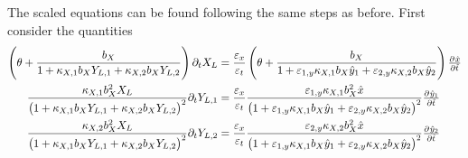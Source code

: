 \documentclass[11pt]{article}
\begin{document}
The scaled equations can be found following the same steps as before. First consider the quantities
\begin{subequations}
\label{eq:generalised-x_t-parts}
\begin{align}
    \left( \theta + \frac{b_X}{1 + \kappa_{X,1} b_{X} Y_{L,1} + \kappa_{X,2} b_{X} Y_{L,2}} \right) \partial_t X_L &= \frac{\varepsilon_x}{\varepsilon_t} \left( \theta + \frac{b_X}{1 + \varepsilon_{1,y} \kappa_{X,1} b_{X} \hat{y}_1 + \varepsilon_{2,y} \kappa_{X,2} b_{X} \hat{y}_2 } \right)  \pd{\hat{x}}{\hat{t}}
    \\
    \frac{\kappa_{X,1} b_X^2 X_L}{\big(1 + \kappa_{X,1} b_{X} Y_{L,1} + \kappa_{X,2} b_{X} Y_{L,2} \big)^2} \partial_t Y_{L,1} 
    &=
    \frac{\varepsilon_x}{\varepsilon_t} \frac{\varepsilon_{1,y} \kappa_{X,1} b_X^2 \hat{x}}{\big(1+ \varepsilon_{1,y} \kappa_{X,1} b_X \hat{y}_1 + \varepsilon_{2,y} \kappa_{X,2} b_X \hat{y}_2 \big)^2} \pd{\hat y_1}{\hat t}
    \\
    \frac{ \kappa_{X,2} b_X^2 X_L }{\big(1 + \kappa_{X,1} b_X Y_{L,1} + \kappa_{X,2} b_X Y_{L,2}\big)^2} \partial_t Y_{L,2}
    &=
    \frac{\varepsilon_x}{\varepsilon_t} \frac{\varepsilon_{2,y} \kappa_{X,2} b_X^2 \hat{x}}{\big(1+ \varepsilon_{1,y} \kappa_{X,1} b_X \hat{y}_1 + \varepsilon_{2,y} \kappa_{X,2} b_X \hat{y}_2 \big)^2} \pd{\hat y_2}{\hat t}
\end{align}
\end{subequations}
\end{document}
